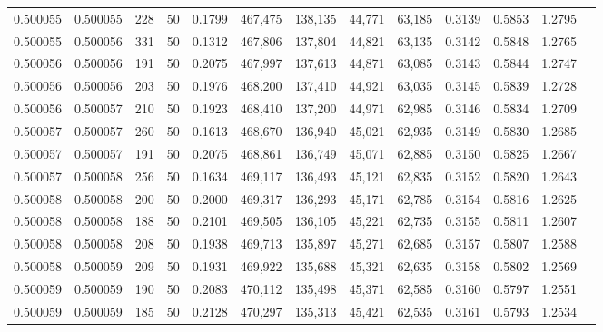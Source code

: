 \begin{tabular}{rrrrrrrrrrrrr}
0.500055 & 0.500055 &   228 &  50 &                                     0.1799 & 467,475 & 138,135 &  44,771 &  63,185 & 0.3139 & 0.5853 & 1.2795 \\
0.500055 & 0.500056 &   331 &  50 &                                     0.1312 & 467,806 & 137,804 &  44,821 &  63,135 & 0.3142 & 0.5848 & 1.2765 \\
0.500056 & 0.500056 &   191 &  50 &                                     0.2075 & 467,997 & 137,613 &  44,871 &  63,085 & 0.3143 & 0.5844 & 1.2747 \\
0.500056 & 0.500056 &   203 &  50 &                                     0.1976 & 468,200 & 137,410 &  44,921 &  63,035 & 0.3145 & 0.5839 & 1.2728 \\
0.500056 & 0.500057 &   210 &  50 &                                     0.1923 & 468,410 & 137,200 &  44,971 &  62,985 & 0.3146 & 0.5834 & 1.2709 \\
0.500057 & 0.500057 &   260 &  50 &                                     0.1613 & 468,670 & 136,940 &  45,021 &  62,935 & 0.3149 & 0.5830 & 1.2685 \\
0.500057 & 0.500057 &   191 &  50 &                                     0.2075 & 468,861 & 136,749 &  45,071 &  62,885 & 0.3150 & 0.5825 & 1.2667 \\
0.500057 & 0.500058 &   256 &  50 &                                     0.1634 & 469,117 & 136,493 &  45,121 &  62,835 & 0.3152 & 0.5820 & 1.2643 \\
0.500058 & 0.500058 &   200 &  50 &                                     0.2000 & 469,317 & 136,293 &  45,171 &  62,785 & 0.3154 & 0.5816 & 1.2625 \\
0.500058 & 0.500058 &   188 &  50 &                                     0.2101 & 469,505 & 136,105 &  45,221 &  62,735 & 0.3155 & 0.5811 & 1.2607 \\
0.500058 & 0.500058 &   208 &  50 &                                     0.1938 & 469,713 & 135,897 &  45,271 &  62,685 & 0.3157 & 0.5807 & 1.2588 \\
0.500058 & 0.500059 &   209 &  50 &                                     0.1931 & 469,922 & 135,688 &  45,321 &  62,635 & 0.3158 & 0.5802 & 1.2569 \\
0.500059 & 0.500059 &   190 &  50 &                                     0.2083 & 470,112 & 135,498 &  45,371 &  62,585 & 0.3160 & 0.5797 & 1.2551 \\
0.500059 & 0.500059 &   185 &  50 &                                     0.2128 & 470,297 & 135,313 &  45,421 &  62,535 & 0.3161 & 0.5793 & 1.2534 \\

\end{tabular}
